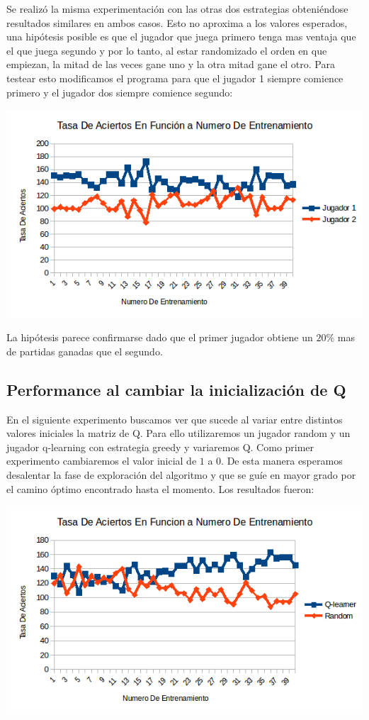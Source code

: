 Se realizó la misma experimentación con las otras dos estrategias obteniéndose resultados similares en ambos casos. Esto no aproxima a los valores esperados, una hipótesis posible es que el jugador que juega primero tenga mas ventaja que el que juega segundo y por lo tanto, al estar randomizado el orden en que empiezan, la mitad de las veces gane uno y la otra mitad gane el otro. Para testear esto modificamos el programa para que el jugador 1 siempre comience primero y el jugador dos siempre comience segundo:

\includegraphics[scale=0.5]{testing/qvsq2.png}

La hipótesis parece confirmarse dado que el primer jugador obtiene un $20 \%$ mas de partidas ganadas que el segundo.

\subsection{Performance al cambiar la inicialización de Q}

En el siguiente experimento buscamos ver que sucede al variar entre distintos valores iniciales la matriz de Q. Para ello utilizaremos un jugador random y un jugador q-learning con estrategia greedy y variaremos Q. Como primer experimento cambiaremos el valor inicial de $1$ a $0$. De esta manera esperamos desalentar la fase de exploración del algoritmo y que se guíe en mayor grado por el camino óptimo encontrado hasta el momento. Los resultados fueron:

\includegraphics[scale=0.5]{testing/variarq.png}

